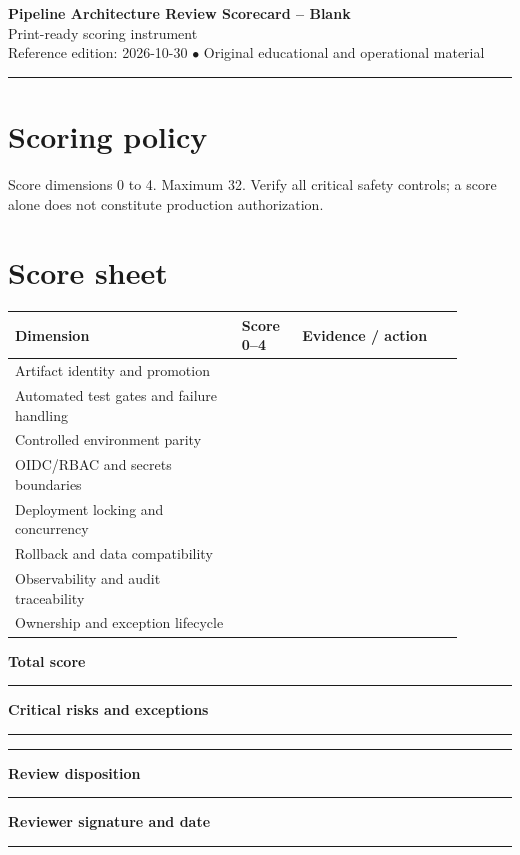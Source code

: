 \documentclass[10pt,letterpaper]{article}
\begin{document}
\begin{center}
{\LARGE\bfseries\color{cdblue}Pipeline Architecture Review Scorecard -- Blank}\\[7pt]
{\large Print-ready scoring instrument}\\[6pt]
{\small Reference edition: 2026-10-30 $\bullet$ Original educational and operational material}
\end{center}
\noindent\color{cdblue}\rule{\linewidth}{1.2pt}\color{black}
\vspace{0.4em}
\section{Scoring policy}
Score dimensions 0 to 4. Maximum 32. Verify all critical safety controls; a score alone does not constitute production authorization.


\section{Score sheet}
\renewcommand{\arraystretch}{1.55}\begin{longtable}{|p{0.45\linewidth}|p{0.12\linewidth}|p{0.32\linewidth}|}\hline\textbf{Dimension} & \textbf{Score 0--4} & \textbf{Evidence / action}\\\hline
Artifact identity and promotion & & \rule{0pt}{32pt} \\\hline
Automated test gates and failure handling & & \rule{0pt}{32pt} \\\hline
Controlled environment parity & & \rule{0pt}{32pt} \\\hline
OIDC/RBAC and secrets boundaries & & \rule{0pt}{32pt} \\\hline
Deployment locking and concurrency & & \rule{0pt}{32pt} \\\hline
Rollback and data compatibility & & \rule{0pt}{32pt} \\\hline
Observability and audit traceability & & \rule{0pt}{32pt} \\\hline
Ownership and exception lifecycle & & \rule{0pt}{32pt} \\\hline
\end{longtable}

\textbf{Total score}\par
\noindent\rule{\linewidth}{0.35pt}\par\vspace{0.7em}
\textbf{Critical risks and exceptions}\par
\noindent\rule{\linewidth}{0.35pt}\par\vspace{0.7em}
\noindent\rule{\linewidth}{0.35pt}\par\vspace{0.7em}
\textbf{Review disposition}\par
\noindent\rule{\linewidth}{0.35pt}\par\vspace{0.7em}
\textbf{Reviewer signature and date}\par
\noindent\rule{\linewidth}{0.35pt}\par\vspace{0.7em}
\end{document}
